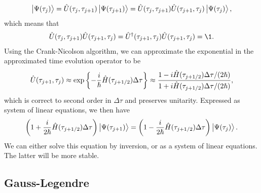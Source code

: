             \begin{align}
                \ket{\Psi(\tau_j)}
                = \hat{U}(\tau_j, \tau_{j + 1})\ket{\Psi(\tau_{j + 1})}
                = \hat{U}(\tau_j, \tau_{j + 1})\hat{U}(\tau_{j + 1}, \tau_j)
                \ket{\Psi(\tau_j)},
            \end{align}
            which means that
            \begin{align}
                \hat{U}(\tau_j, \tau_{j + 1})
                \hat{U}(\tau_{j + 1}, \tau_j)
                = \hat{U}^{\dagger}(\tau_{j + 1}, \tau_j)
                \hat{U}(\tau_{j + 1}, \tau_j)
                = \1.
            \end{align}
            Using the Crank-Nicolson algorithm, we can approximate the exponential
            in the approximated time evolution operator to be
            \begin{align}
                \hat{U}(\tau_{j + 1}, \tau_j)
                \approx \exp\left\{ 
                    -\frac{i}{\hslash}\hat{H}(\tau_{j + 1/2})\Delta \tau
                 \right\}
                \approx
                \frac{1 - i\hat{H}(\tau_{j + 1/2})\Delta\tau/(2\hslash)}
                {1 + i\hat{H}(\tau_{j + 1/2})\Delta\tau/(2\hslash)},
            \end{align}
            which is correct to second order in $\Delta \tau$ and preserves
            unitarity. Expressed as system of linear equations, we then have
            \begin{align}
                \left( 
                    1 + \frac{i}{2\hslash}\hat{H}(\tau_{j + 1/2})\Delta\tau
                 \right)\ket{\Psi(\tau_{j + 1})}
                =
                \left( 
                    1 - \frac{i}{2\hslash}\hat{H}(\tau_{j + 1/2})\Delta\tau
                 \right)\ket{\Psi(\tau_{j})}.
            \end{align}
            We can either solve this equation by inversion, or as a system of linear
            equations. The latter will be more stable.

        \subsection{Gauss-Legendre}
